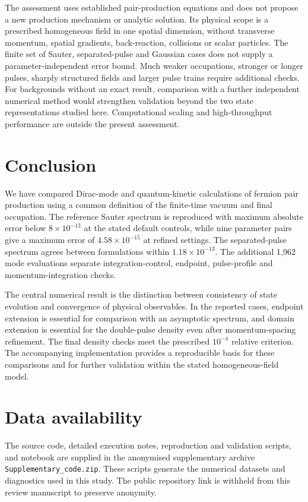 \documentclass[anonymous]{iopjournal}
\begin{document}
The assessment uses established pair-production equations and does not propose a new production mechanism or analytic solution. Its physical scope is a prescribed homogeneous field in one spatial dimension, without transverse momentum, spatial gradients, back-reaction, collisions or scalar particles. The finite set of Sauter, separated-pulse and Gaussian cases does not supply a parameter-independent error bound. Much weaker occupations, stronger or longer pulses, sharply structured fields and larger pulse trains require additional checks. For backgrounds without an exact result, comparison with a further independent numerical method would strengthen validation beyond the two state representations studied here. Computational scaling and high-throughput performance are outside the present assessment.

\section{Conclusion}

We have compared Dirac-mode and quantum-kinetic calculations of fermion pair production using a common definition of the finite-time vacuum and final occupation. The reference Sauter spectrum is reproduced with maximum absolute error below $8\times10^{-13}$ at the stated default controls, while nine parameter pairs give a maximum error of $4.58\times10^{-15}$ at refined settings. The separated-pulse spectrum agrees between formulations within $1.18\times10^{-13}$. The additional 1,962 mode evaluations separate integration-control, endpoint, pulse-profile and momentum-integration checks.

The central numerical result is the distinction between consistency of state evolution and convergence of physical observables. In the reported cases, endpoint extension is essential for comparison with an asymptotic spectrum, and domain extension is essential for the double-pulse density even after momentum-spacing refinement. The final density checks meet the prescribed $10^{-4}$ relative criterion. The accompanying implementation provides a reproducible basis for these comparisons and for further validation within the stated homogeneous-field model.

\section*{Data availability}
The source code, detailed execution notes, reproduction and validation scripts, and notebook are supplied in the anonymised supplementary archive \texttt{Supplementary\_code.zip}. These scripts generate the numerical datasets and diagnostics used in this study. The public repository link is withheld from this review manuscript to preserve anonymity.
\end{document}

